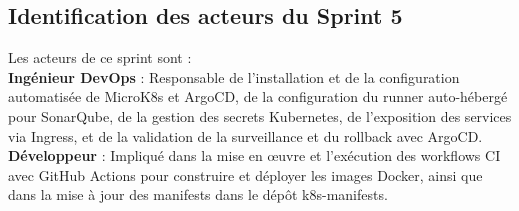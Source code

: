 \subsection{Identification des acteurs du Sprint 5}
Les acteurs de ce sprint sont : \\
    \textbf{Ingénieur DevOps} : Responsable de l’installation et de la configuration automatisée de MicroK8s et ArgoCD, de la configuration du runner auto-hébergé pour SonarQube, de la gestion des secrets Kubernetes, de l’exposition des services via Ingress, et de la validation de la surveillance et du rollback avec ArgoCD. \\
    \textbf{Développeur} : Impliqué dans la mise en œuvre et l’exécution des workflows CI avec GitHub Actions pour construire et déployer les images Docker, ainsi que dans la mise à jour des manifests dans le dépôt k8s-manifests. \\
